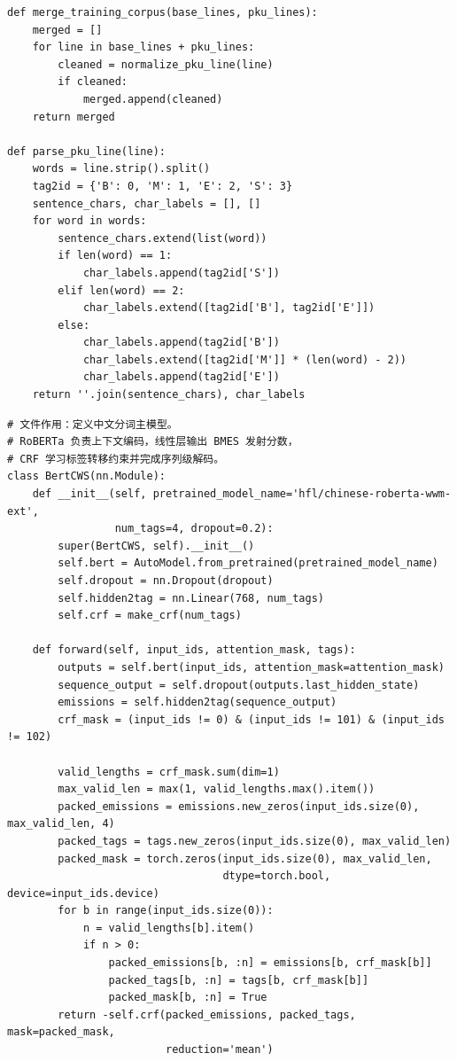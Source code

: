 \documentclass[12pt,a4paper,UTF8]{ctexart}
\newcommand{\xiaosi}{\fontsize{12pt}{18pt}\selectfont}
\newenvironment{reportbody}{\songti\xiaosi\onehalfspacing\sloppy}{}
\begin{document}
\begin{reportbody}
\begin{lstlisting}[style=appendixcode, caption={data\_prepare.py：训练语料清洗合并与 BMES 标注}]
def merge_training_corpus(base_lines, pku_lines):
    merged = []
    for line in base_lines + pku_lines:
        cleaned = normalize_pku_line(line)
        if cleaned:
            merged.append(cleaned)
    return merged

def parse_pku_line(line):
    words = line.strip().split()
    tag2id = {'B': 0, 'M': 1, 'E': 2, 'S': 3}
    sentence_chars, char_labels = [], []
    for word in words:
        sentence_chars.extend(list(word))
        if len(word) == 1:
            char_labels.append(tag2id['S'])
        elif len(word) == 2:
            char_labels.extend([tag2id['B'], tag2id['E']])
        else:
            char_labels.append(tag2id['B'])
            char_labels.extend([tag2id['M']] * (len(word) - 2))
            char_labels.append(tag2id['E'])
    return ''.join(sentence_chars), char_labels
\end{lstlisting}

\begin{lstlisting}[style=appendixcode, caption={model\_bert.py：RoBERTa+CRF 中文分词模型}]
# 文件作用：定义中文分词主模型。
# RoBERTa 负责上下文编码，线性层输出 BMES 发射分数，
# CRF 学习标签转移约束并完成序列级解码。
class BertCWS(nn.Module):
    def __init__(self, pretrained_model_name='hfl/chinese-roberta-wwm-ext',
                 num_tags=4, dropout=0.2):
        super(BertCWS, self).__init__()
        self.bert = AutoModel.from_pretrained(pretrained_model_name)
        self.dropout = nn.Dropout(dropout)
        self.hidden2tag = nn.Linear(768, num_tags)
        self.crf = make_crf(num_tags)

    def forward(self, input_ids, attention_mask, tags):
        outputs = self.bert(input_ids, attention_mask=attention_mask)
        sequence_output = self.dropout(outputs.last_hidden_state)
        emissions = self.hidden2tag(sequence_output)
        crf_mask = (input_ids != 0) & (input_ids != 101) & (input_ids != 102)

        valid_lengths = crf_mask.sum(dim=1)
        max_valid_len = max(1, valid_lengths.max().item())
        packed_emissions = emissions.new_zeros(input_ids.size(0), max_valid_len, 4)
        packed_tags = tags.new_zeros(input_ids.size(0), max_valid_len)
        packed_mask = torch.zeros(input_ids.size(0), max_valid_len,
                                  dtype=torch.bool, device=input_ids.device)
        for b in range(input_ids.size(0)):
            n = valid_lengths[b].item()
            if n > 0:
                packed_emissions[b, :n] = emissions[b, crf_mask[b]]
                packed_tags[b, :n] = tags[b, crf_mask[b]]
                packed_mask[b, :n] = True
        return -self.crf(packed_emissions, packed_tags, mask=packed_mask,
                         reduction='mean')


\end{lstlisting}
\end{reportbody}
\end{document}
